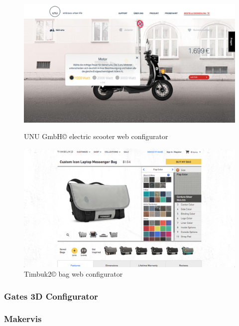 \documentclass[Medieninformatik-arbeit.tex]{subfiles}
\begin{document}
\begin{figure}[h]
\centering
\begin{minipage}{.49\textwidth}
  \centering
  \includegraphics[width=\columnwidth]{RelatedWork/img/unu-config}
  \caption{UNU GmbH\copyright{} electric scooter web configurator\cite{unu:2015:Online}}
\label{fig:unu-config}
\end{minipage}
\begin{minipage}{.49\textwidth}
  \centering
  \includegraphics[width=\columnwidth]{RelatedWork/img/timbuk2-config}
  \caption{Timbuk2\copyright{} bag web configurator\cite{timbuk2:2015:Online}}
\label{fig:timbuk2-config}
\end{minipage}
\end{figure}

\subsubsection{Gates 3D Configurator}

\subsubsection{Makervis}
\end{document}
